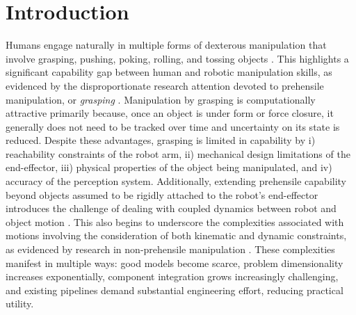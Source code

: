 \section{Introduction}

Humans engage naturally in multiple forms of dexterous manipulation that involve grasping, pushing, poking, rolling, and tossing objects \cite{bullock2011classifying}.
This highlights a significant capability gap between human and robotic manipulation skills, as evidenced by the disproportionate research attention devoted to prehensile manipulation, or \textsl{grasping} \cite{billard2019trends}.
Manipulation by grasping is computationally attractive primarily because, once an object is under form or force closure, it generally does not need to be tracked over time and uncertainty on its state is reduced.
Despite these advantages, grasping is limited in capability by i) reachability constraints of the robot arm, ii) mechanical design limitations of the end-effector, iii) physical properties of the object being manipulated, and iv) accuracy of the perception system.
Additionally, extending prehensile capability beyond objects assumed to be rigidly attached to the robot's end-effector introduces the challenge of dealing with coupled dynamics between robot and object motion \cite{yin2021modeling,ichnowski2022gomp}.
This also begins to underscore the complexities associated with motions involving the consideration of both kinematic and dynamic constraints, as evidenced by research in non-prehensile manipulation \cite{ruggiero2018nonprehensile}.
These complexities manifest in multiple ways: good models become scarce, problem dimensionality increases exponentially, component integration grows increasingly challenging, and existing pipelines demand substantial engineering effort, reducing practical utility.


